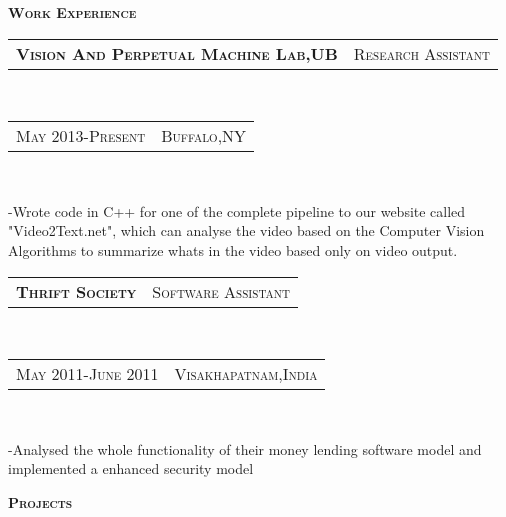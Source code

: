 \documentclass[10pt,a4paper,oneside]{article}
\begin{document}
    \begin{minipage}[t]{0.63\textwidth}
        \vspace{0pt}
        \textcolor{light-gray}{\textbf{\large W\textsc{ork} E\textsc{xperience}}}
        \vspace{10pt}\\
        \begin{tabular}{c|c}
            \textbf{\normalsize V\textsc{ision} A\textsc{nd} P\textsc{erpetual} M\textsc{achine} L\textsc{ab},UB}
            &\textmd{\normalsize R\textsc{esearch} A\textsc{ssistant}}
        \end{tabular}\\
        \textcolor{light-gray}{
            \begin{tabular}{c|c}
                {\small M\textsc{ay 2013}-P\textsc{resent}}
               &{\small B\textsc{uffalo},NY}
            \end{tabular}
        }\\ 
        \vspace{-4mm}
        \begin{adjustwidth}{7pt}{0pt}
        {\footnotesize -Wrote code in C++ for one of the complete pipeline to our website called "Video2Text.net", which can analyse 
    the video based on the Computer Vision Algorithms to
summarize whats in the video based only on video output.}\\
        \end{adjustwidth}
        \begin{tabular}{c|c}
            \textbf{\normalsize T\textsc{hrift} S\textsc{ociety}}
            &\textmd{\normalsize S\textsc{oftware} A\textsc{ssistant}}
        \end{tabular}\\
        \textcolor{light-gray}{
            \begin{tabular}{c|c}
                {\small M\textsc{ay 2011}-J\textsc{une 2011}}
                &{\small V\textsc{isakhapatnam},I\textsc{ndia}}
            \end{tabular}
        }\\ 
        \vspace{-4mm}
        \begin{adjustwidth}{7pt}{0pt}
        {\footnotesize -Analysed the whole functionality of their money lending software model and implemented a enhanced security
        model}\\
        \end{adjustwidth}
        \textcolor{light-gray}{\textbf{\large P\textsc{rojects}}}

\end{minipage}
\end{document}
